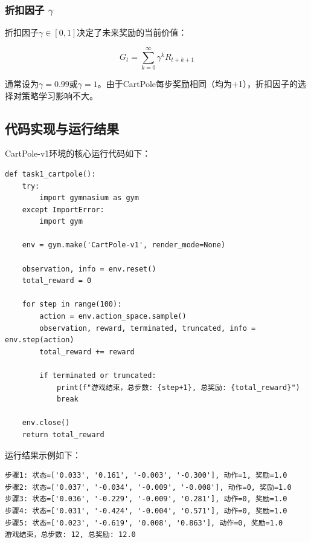 \documentclass[12pt,a4paper]{article}
\begin{document}
\subsubsection{折扣因子 $\gamma$}

折扣因子$\gamma \in [0,1]$决定了未来奖励的当前价值：

\begin{equation}
G_t = \sum_{k=0}^{\infty} \gamma^k R_{t+k+1}
\end{equation}

通常设为$\gamma = 0.99$或$\gamma = 1$。由于CartPole每步奖励相同（均为+1），折扣因子的选择对策略学习影响不大。

\subsection{代码实现与运行结果}

CartPole-v1环境的核心运行代码如下：

\begin{lstlisting}[caption={CartPole-v1环境运行代码}]
def task1_cartpole():
    try:
        import gymnasium as gym
    except ImportError:
        import gym
    
    env = gym.make('CartPole-v1', render_mode=None)
    
    observation, info = env.reset()
    total_reward = 0
    
    for step in range(100):
        action = env.action_space.sample()
        observation, reward, terminated, truncated, info = env.step(action)
        total_reward += reward
        
        if terminated or truncated:
            print(f"游戏结束，总步数: {step+1}, 总奖励: {total_reward}")
            break
    
    env.close()
    return total_reward
\end{lstlisting}

运行结果示例如下：

\begin{lstlisting}[caption={CartPole-v1运行示例输出}]
步骤1: 状态=['0.033', '0.161', '-0.003', '-0.300'], 动作=1, 奖励=1.0
步骤2: 状态=['0.037', '-0.034', '-0.009', '-0.008'], 动作=0, 奖励=1.0
步骤3: 状态=['0.036', '-0.229', '-0.009', '0.281'], 动作=0, 奖励=1.0
步骤4: 状态=['0.031', '-0.424', '-0.004', '0.571'], 动作=0, 奖励=1.0
步骤5: 状态=['0.023', '-0.619', '0.008', '0.863'], 动作=0, 奖励=1.0
游戏结束，总步数: 12, 总奖励: 12.0
\end{lstlisting}
\end{document}
